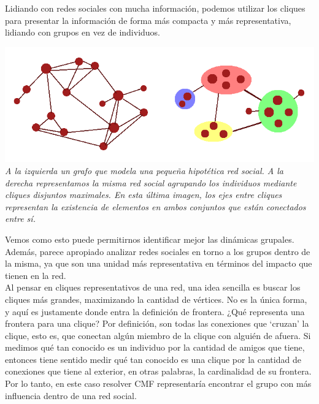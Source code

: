 Lidiando con redes sociales con mucha información, podemos utilizar los cliques para presentar la información de forma más compacta y más representativa, lidiando con grupos en vez de individuos. \\

\vspace{-1cm}
\begin{center}
	\includegraphics[scale=0.9]{informe/imgs/example.png}
	\textit{A la izquierda un grafo que modela una pequeña hipotética red social. A la derecha representamos la misma red social agrupando los individuos mediante cliques disjuntos maximales. En esta última imagen, los ejes entre cliques representan la existencia de elementos en ambos conjuntos que están conectados entre sí.}
\end{center}

Vemos como esto puede permitirnos identificar mejor las dinámicas grupales. Además, parece apropiado analizar redes sociales en torno a los grupos dentro de la misma, ya que son una unidad más representativa en términos del impacto que tienen en la red. \\

Al pensar en cliques representativos de una red, una idea sencilla es buscar los cliques más grandes, maximizando la cantidad de vértices. No es la única forma, y aquí es justamente donde entra la definición de frontera. ¿Qué representa una frontera para una clique? Por definición, son todas las conexiones que `cruzan' la clique, esto es, que conectan algún miembro de la clique con alguién de afuera. Si medimos qué tan conocido es un individuo por la cantidad de amigos que tiene, entonces tiene sentido medir qué tan conocido es una clique por la cantidad de conexiones que tiene al exterior, en otras palabras, la cardinalidad de su frontera. Por lo tanto, en este caso resolver CMF representaría encontrar el grupo con más influencia dentro de una red social. \\
